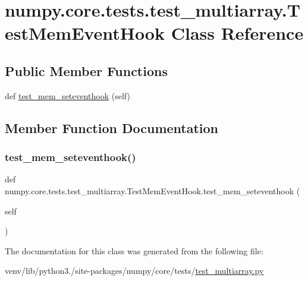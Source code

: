\hypertarget{classnumpy_1_1core_1_1tests_1_1test__multiarray_1_1TestMemEventHook}{}\section{numpy.\+core.\+tests.\+test\+\_\+multiarray.\+Test\+Mem\+Event\+Hook Class Reference}
\label{classnumpy_1_1core_1_1tests_1_1test__multiarray_1_1TestMemEventHook}
\subsection*{Public Member Functions}
\begin{DoxyCompactItemize}
\item 
def \hyperlink{classnumpy_1_1core_1_1tests_1_1test__multiarray_1_1TestMemEventHook_adc3609cc920407aba6d2d6ac53f753ab}{test\+\_\+mem\+\_\+seteventhook} (self)
\end{DoxyCompactItemize}


\subsection{Member Function Documentation}
\mbox{\label{classnumpy_1_1core_1_1tests_1_1test__multiarray_1_1TestMemEventHook_adc3609cc920407aba6d2d6ac53f753ab}} 
\subsubsection{\texorpdfstring{test\+\_\+mem\+\_\+seteventhook()}{test\_mem\_seteventhook()}}
{\footnotesize\ttfamily def numpy.\+core.\+tests.\+test\+\_\+multiarray.\+Test\+Mem\+Event\+Hook.\+test\+\_\+mem\+\_\+seteventhook (\begin{DoxyParamCaption}\item[{}]{self }\end{DoxyParamCaption})}



The documentation for this class was generated from the following file\+:\begin{DoxyCompactItemize}
\item 
venv/lib/python3./site-\/packages/numpy/core/tests/\hyperlink{core_2tests_2test__multiarray_8py}{test\+\_\+multiarray.\+py}\end{DoxyCompactItemize}
